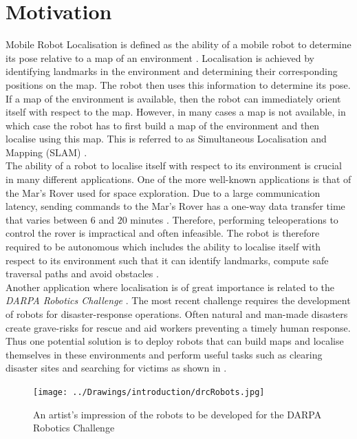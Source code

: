 \documentclass[11pt]{report}
\begin{document}
\section{Motivation}
\label{sec:motivation}
Mobile Robot Localisation is defined as the ability of a mobile robot to determine its pose relative to a map of an environment \cite{Thrun2002}. Localisation is achieved by identifying landmarks in the environment and determining their corresponding positions on the map. The robot then uses this information to determine its pose. If a map of the environment is available, then the robot can immediately orient itself with respect to the map. However, in many cases a map is not available, in which case the robot has to first build a map of the environment and then localise using this map. This is referred to as Simultaneous Localisation and Mapping (SLAM) \cite{Durrant2006, Bailey2006b}.\\

The ability of a robot to localise itself with respect to its environment is crucial in many different applications. One of the more well-known applications is that of the Mar's Rover used for space exploration. Due to a large communication latency, sending commands to the Mar's Rover has a one-way data transfer time that varies between $6$ and $20$ minutes \cite{Powell2006}. Therefore, performing teleoperations to control the rover is impractical and often infeasible. The robot is therefore required to be autonomous which includes the ability to localise itself with respect to its environment such that it can identify landmarks, compute safe traversal paths and avoid obstacles \cite{Powell2006}.\\

Another application where localisation is of great importance is related to the \textit{DARPA Robotics Challenge} \cite{darpa}. The most recent challenge requires the development of robots for disaster-response operations. Often natural and man-made disasters create grave-risks for rescue and aid workers preventing a timely human response. Thus one potential solution is to deploy robots that can build maps and localise themselves in these environments and perform useful tasks such as clearing disaster sites and searching for victims as shown in  \cite{darpa}.\\   

\begin{figure}[h!] 
  \centering
    \texttt{[image: ../Drawings/introduction/drcRobots.jpg]}
    \caption{An artist's impression of the robots to be developed for the DARPA Robotics Challenge}
    \label{fig:darpa}
\end{figure}
\end{document}
